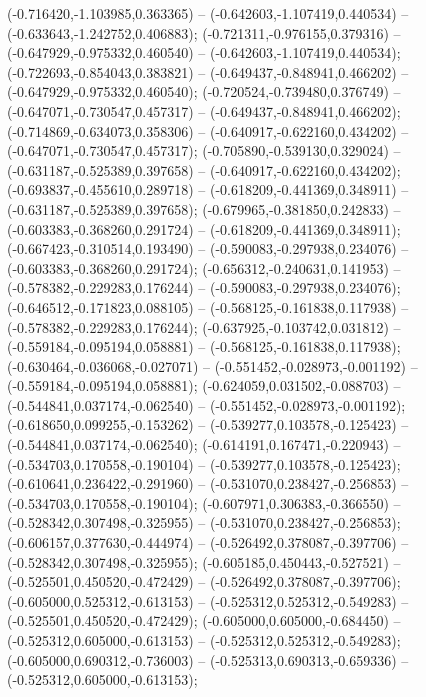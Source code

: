  (-0.716420,-1.103985,0.363365) -- (-0.642603,-1.107419,0.440534) -- (-0.633643,-1.242752,0.406883);
 (-0.721311,-0.976155,0.379316) -- (-0.647929,-0.975332,0.460540) -- (-0.642603,-1.107419,0.440534);
 (-0.722693,-0.854043,0.383821) -- (-0.649437,-0.848941,0.466202) -- (-0.647929,-0.975332,0.460540);
 (-0.720524,-0.739480,0.376749) -- (-0.647071,-0.730547,0.457317) -- (-0.649437,-0.848941,0.466202);
 (-0.714869,-0.634073,0.358306) -- (-0.640917,-0.622160,0.434202) -- (-0.647071,-0.730547,0.457317);
 (-0.705890,-0.539130,0.329024) -- (-0.631187,-0.525389,0.397658) -- (-0.640917,-0.622160,0.434202);
 (-0.693837,-0.455610,0.289718) -- (-0.618209,-0.441369,0.348911) -- (-0.631187,-0.525389,0.397658);
 (-0.679965,-0.381850,0.242833) -- (-0.603383,-0.368260,0.291724) -- (-0.618209,-0.441369,0.348911);
 (-0.667423,-0.310514,0.193490) -- (-0.590083,-0.297938,0.234076) -- (-0.603383,-0.368260,0.291724);
 (-0.656312,-0.240631,0.141953) -- (-0.578382,-0.229283,0.176244) -- (-0.590083,-0.297938,0.234076);
 (-0.646512,-0.171823,0.088105) -- (-0.568125,-0.161838,0.117938) -- (-0.578382,-0.229283,0.176244);
 (-0.637925,-0.103742,0.031812) -- (-0.559184,-0.095194,0.058881) -- (-0.568125,-0.161838,0.117938);
 (-0.630464,-0.036068,-0.027071) -- (-0.551452,-0.028973,-0.001192) -- (-0.559184,-0.095194,0.058881);
 (-0.624059,0.031502,-0.088703) -- (-0.544841,0.037174,-0.062540) -- (-0.551452,-0.028973,-0.001192);
 (-0.618650,0.099255,-0.153262) -- (-0.539277,0.103578,-0.125423) -- (-0.544841,0.037174,-0.062540);
 (-0.614191,0.167471,-0.220943) -- (-0.534703,0.170558,-0.190104) -- (-0.539277,0.103578,-0.125423);
 (-0.610641,0.236422,-0.291960) -- (-0.531070,0.238427,-0.256853) -- (-0.534703,0.170558,-0.190104);
 (-0.607971,0.306383,-0.366550) -- (-0.528342,0.307498,-0.325955) -- (-0.531070,0.238427,-0.256853);
 (-0.606157,0.377630,-0.444974) -- (-0.526492,0.378087,-0.397706) -- (-0.528342,0.307498,-0.325955);
 (-0.605185,0.450443,-0.527521) -- (-0.525501,0.450520,-0.472429) -- (-0.526492,0.378087,-0.397706);
 (-0.605000,0.525312,-0.613153) -- (-0.525312,0.525312,-0.549283) -- (-0.525501,0.450520,-0.472429);
 (-0.605000,0.605000,-0.684450) -- (-0.525312,0.605000,-0.613153) -- (-0.525312,0.525312,-0.549283);
 (-0.605000,0.690312,-0.736003) -- (-0.525313,0.690313,-0.659336) -- (-0.525312,0.605000,-0.613153);
